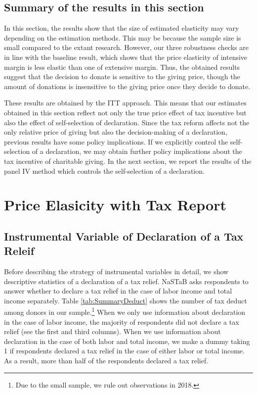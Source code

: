 \documentclass[
  11pt,
  a4paper,
]{article}
\begin{document}
\hypertarget{summary-of-the-results-in-this-section}{%
\subsection{Summary of the results in this section}\label{summary-of-the-results-in-this-section}}

In this section,
the results show that the size of estimated elasticity may vary depending on the estimation methods.
This may be because the sample size is small compared to the extant research.
However, our three robustness checks are in line with the baseline result,
which shows that the price elasticity of intensive margin is less elastic than one of extensive margin.
Thus, the obtained results suggest that the decision to donate is sensitive to the giving price,
though the amount of donations is insensitive to the giving price once they decide to donate.

These results are obtained by the ITT approach.
This means that our estimates obtained in this section reflect not only
the true price effect of tax incentive but also the effect of self-selection of declaration.
Since the tax reform affects not the only relative price of giving but also the decision-making of a declaration,
previous results have some policy implications.
If we explicitly control the self-selection of a declaration,
we may obtain further policy implications about the tax incentive of charitable giving.
In the next section, we report the results of the panel IV method which controls the self-selection of a declaration.

\hypertarget{price-elasicity-with-tax-report}{%
\section{Price Elasicity with Tax Report}\label{price-elasicity-with-tax-report}}

\hypertarget{instrumental-variable-of-declaration-of-a-tax-releif}{%
\subsection{Instrumental Variable of Declaration of a Tax Releif}\label{instrumental-variable-of-declaration-of-a-tax-releif}}

Before describing the strategy of instrumental variables in detail,
we show descriptive statistics of a declaration of a tax relief.
NaSTaB asks respondents to answer whether to declare a tax relief
in the case of labor income and total income separately.
Table \ref{tab:SummaryDeduct} shows the number of tax deduct among donors in our sample.\footnote{Due to the small sample, we rule out observations in 2018.}
When we only use information about declaration in the case of labor income,
the majority of respondents did not declare a tax relief (see the first and third columns).
When we use information about declaration in the case of both labor and total income,
we make a dummy taking 1 if respondents declared a tax relief in the case of
either labor or total income.
As a result, more than half of the respondents declared a tax relief.
\end{document}
